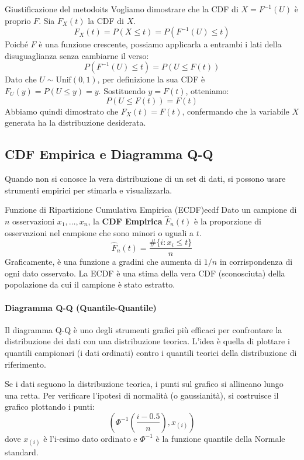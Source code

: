 \begin{dimostrazione}{Giustificazione del metodo}{its}
Vogliamo dimostrare che la CDF di \( X = F^{-1}(U) \) è proprio \( F \). Sia \( F_X(t) \) la CDF di \( X \).
\[
F_X(t) = P(X \le t) = P(F^{-1}(U) \le t)
\]
Poiché \( F \) è una funzione crescente, possiamo applicarla a entrambi i lati della disuguaglianza senza cambiarne il verso:
\[
P(F^{-1}(U) \le t) = P(U \le F(t))
\]
Dato che \( U \sim \text{Unif}(0,1) \), per definizione la sua CDF è \( F_U(y) = P(U \le y) = y \). Sostituendo \( y = F(t) \), otteniamo:
\[
P(U \le F(t)) = F(t)
\]
Abbiamo quindi dimostrato che \( F_X(t) = F(t) \), confermando che la variabile \( X \) generata ha la distribuzione desiderata.
\end{dimostrazione}

\subsection{CDF Empirica e Diagramma Q-Q}\label{ssec:ecdf_qq}
Quando non si conosce la vera distribuzione di un set di dati, si possono usare strumenti empirici per stimarla e visualizzarla.

\begin{definizione}{Funzione di Ripartizione Cumulativa Empirica (ECDF)}{ecdf}
Dato un campione di \( n \) osservazioni \( x_1, \dots, x_n \), la \textbf{CDF Empirica} \( \hat{F}_n(t) \) è la proporzione di osservazioni nel campione che sono minori o uguali a \( t \).
\[
\hat{F}_n(t) = \frac{\#\{i: x_i \le t\}}{n}
\]
Graficamente, è una funzione a gradini che aumenta di \( 1/n \) in corrispondenza di ogni dato osservato. La ECDF è una stima della vera CDF (sconosciuta) della popolazione da cui il campione è stato estratto.
\end{definizione}

\paragraph{Diagramma Q-Q (Quantile-Quantile)}
Il diagramma Q-Q è uno degli strumenti grafici più efficaci per confrontare la distribuzione dei dati con una distribuzione teorica. L'idea è quella di plottare i quantili campionari (i dati ordinati) contro i quantili teorici della distribuzione di riferimento.

Se i dati seguono la distribuzione teorica, i punti sul grafico si allineano lungo una retta. Per verificare l'ipotesi di normalità (o gaussianità), si costruisce il grafico plottando i punti:
\[
\left( \Phi^{-1}\left( \frac{i-0.5}{n} \right), x_{(i)} \right)
\]
dove \( x_{(i)} \) è l'i-esimo dato ordinato e \( \Phi^{-1} \) è la funzione quantile della Normale standard.

